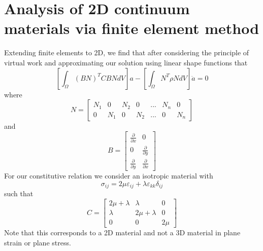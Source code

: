 \documentclass{article}
\begin{document}
\section{Analysis of 2D continuum materials via finite element method}
Extending finite elements to 2D, we find that after considering the principle 
of virtual work and approximating our solution using linear shape functions 
that 
\begin{equation}
\left[\int_{\Omega} (BN)^T C BN dV\right]a 
- \left[ \int_{\Omega} N^T \rho N dV \right]\ddot{a} = 0
\end{equation}
where
\begin{equation}
	N = 	
	\begin{bmatrix}
	N_1 & 0 & N_2 & 0 & ... & N_n & 0 \\
	0 & N_1 & 0 & N_2 & ... & 0 & N_n
	\end{bmatrix}
\end{equation}
and 
\begin{equation}
	B =
	\begin{bmatrix}
		\frac{\partial }{\partial x} & 0 \\
		0 & \frac{\partial }{\partial y} \\
		\frac{\partial }{\partial y} & \frac{\partial }{\partial x}
	\end{bmatrix}
\end{equation}
For our constitutive relation we consider an isotropic material with
\begin{equation}
	\sigma_{ij} = 2\mu\varepsilon_{ij} + \lambda\varepsilon_{kk}\delta_{ij}
\end{equation}
such that
\begin{equation}
	C = 
	\begin{bmatrix}
	2\mu+\lambda & \lambda & 0 \\
	\lambda & 2\mu + \lambda & 0 \\
	0 & 0 & 2\mu 
	\end{bmatrix}
\end{equation}
Note that this corresponds to a 2D material and not a 3D material in plane 
strain or plane stress.
\end{document}
